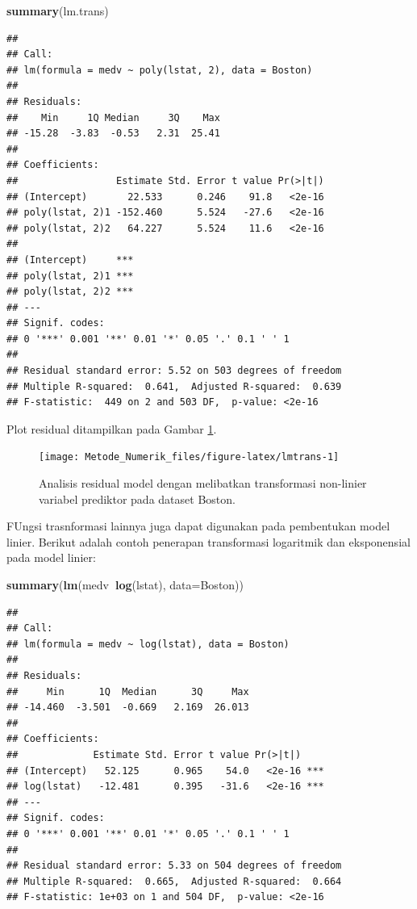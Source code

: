 \documentclass[]{book}
\newenvironment{Shaded}{\begin{snugshade}}{\end{snugshade}}
\newcommand{\DataTypeTok}[1]{\textcolor[rgb]{0.13,0.29,0.53}{#1}}
\newcommand{\KeywordTok}[1]{\textcolor[rgb]{0.13,0.29,0.53}{\textbf{#1}}}
\newcommand{\NormalTok}[1]{#1}
\newcommand{\OperatorTok}[1]{\textcolor[rgb]{0.81,0.36,0.00}{\textbf{#1}}}
\theoremstyle{definition}
\theoremstyle{definition}
\theoremstyle{definition}
\theoremstyle{remark}
\begin{document}
\begin{Shaded}
\begin{Highlighting}[]
\KeywordTok{summary}\NormalTok{(lm.trans)}
\end{Highlighting}
\end{Shaded}

\begin{verbatim}
## 
## Call:
## lm(formula = medv ~ poly(lstat, 2), data = Boston)
## 
## Residuals:
##    Min     1Q Median     3Q    Max 
## -15.28  -3.83  -0.53   2.31  25.41 
## 
## Coefficients:
##                 Estimate Std. Error t value Pr(>|t|)
## (Intercept)       22.533      0.246    91.8   <2e-16
## poly(lstat, 2)1 -152.460      5.524   -27.6   <2e-16
## poly(lstat, 2)2   64.227      5.524    11.6   <2e-16
##                    
## (Intercept)     ***
## poly(lstat, 2)1 ***
## poly(lstat, 2)2 ***
## ---
## Signif. codes:  
## 0 '***' 0.001 '**' 0.01 '*' 0.05 '.' 0.1 ' ' 1
## 
## Residual standard error: 5.52 on 503 degrees of freedom
## Multiple R-squared:  0.641,  Adjusted R-squared:  0.639 
## F-statistic:  449 on 2 and 503 DF,  p-value: <2e-16
\end{verbatim}

Plot residual ditampilkan pada Gambar \ref{fig:lmtrans}.

\begin{figure}

{\centering \texttt{[image: Metode\_Numerik\_files/figure-latex/lmtrans-1]} 

}

\caption{Analisis residual model dengan melibatkan transformasi non-linier variabel prediktor pada dataset Boston.}\label{fig:lmtrans}
\end{figure}

FUngsi trasnformasi lainnya juga dapat digunakan pada pembentukan model linier. Berikut adalah contoh penerapan transformasi logaritmik dan eksponensial pada model linier:

\begin{Shaded}
\begin{Highlighting}[]
\KeywordTok{summary}\NormalTok{(}\KeywordTok{lm}\NormalTok{(medv}\OperatorTok{~}\KeywordTok{log}\NormalTok{(lstat), }\DataTypeTok{data=}\NormalTok{Boston))}
\end{Highlighting}
\end{Shaded}

\begin{verbatim}
## 
## Call:
## lm(formula = medv ~ log(lstat), data = Boston)
## 
## Residuals:
##     Min      1Q  Median      3Q     Max 
## -14.460  -3.501  -0.669   2.169  26.013 
## 
## Coefficients:
##             Estimate Std. Error t value Pr(>|t|)    
## (Intercept)   52.125      0.965    54.0   <2e-16 ***
## log(lstat)   -12.481      0.395   -31.6   <2e-16 ***
## ---
## Signif. codes:  
## 0 '***' 0.001 '**' 0.01 '*' 0.05 '.' 0.1 ' ' 1
## 
## Residual standard error: 5.33 on 504 degrees of freedom
## Multiple R-squared:  0.665,  Adjusted R-squared:  0.664 
## F-statistic: 1e+03 on 1 and 504 DF,  p-value: <2e-16
\end{verbatim}
\end{document}
